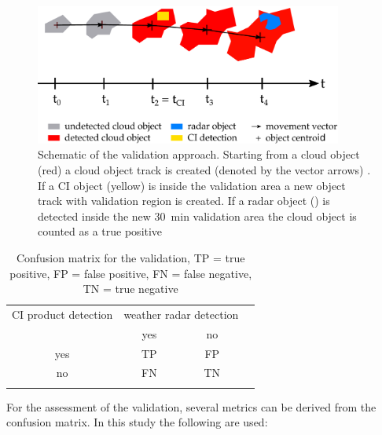 \begin{figure}[htbp]
\centering
\includegraphics[width=0.9\textwidth]{Grafiken/Abbildungen/verification_scheme_new.pdf}
\caption{Schematic of the validation approach. Starting from a cloud object (red) a cloud object track is created (denoted by the vector arrows) . If a CI object (yellow) is inside the validation area a new object track with validation region is created. If a radar object () is detected inside the new \SI{30}{\minute} validation area the cloud object is counted as a true positive}
\label{fig:schema}
\end{figure}

\begin{table}[htbp]
\centering
\caption{Confusion matrix for the validation, TP = true positive, FP = false positive, FN = false negative, TN = true negative}
\begin{tabular}{cccc} 
\toprule
{CI product detection} & \multicolumn{2}{c}{weather radar detection} \\
					   \cmidrule{2-3}
					   & yes  & no \\
\midrule
yes                    &  TP  & FP \\
no                     &  FN  & TN \\ 
\addlinespace
\bottomrule
\end{tabular}
\label{tab:confusion}
\end{table}

For the assessment of the validation, several metrics can be derived from the confusion matrix. In this study the following are used:

